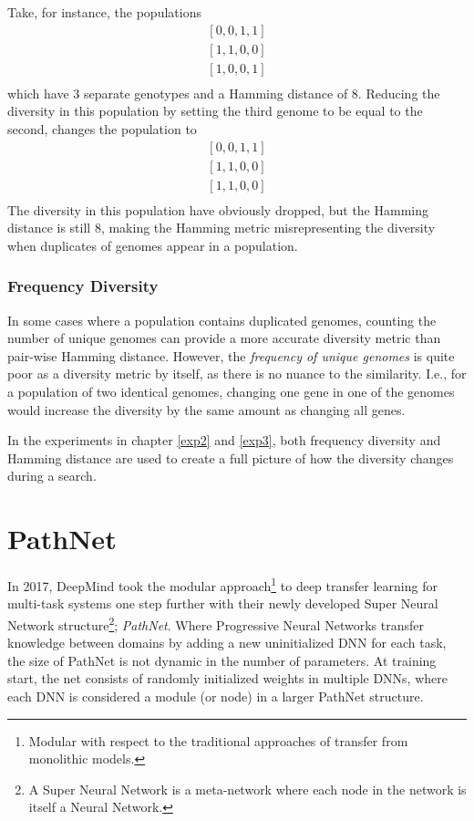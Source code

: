 Take, for instance, the populations 
\begin{equation*}
    \begin{split}
        [0, 0, 1, 1]\\
        [1, 1, 0, 0]\\
        [1, 0, 0, 1]\\
    \end{split}
\end{equation*}
which have 3 separate genotypes and a Hamming distance of 8. Reducing the diversity in this population by setting the third genome to be equal to the second, changes the population to 
\begin{equation*}
    \begin{split}
        [0, 0, 1, 1]\\
        [1, 1, 0, 0]\\
        [1, 1, 0, 0]\\
    \end{split}
\end{equation*}
The diversity in this population have obviously dropped, but the Hamming distance is still 8, making the Hamming metric misrepresenting the diversity when duplicates of genomes appear in a population. 

\subsubsection{Frequency Diversity}
In some cases where a population contains duplicated genomes, counting the number of unique genomes can provide a more accurate diversity metric than pair-wise Hamming distance. However, the \textit{frequency of unique genomes} is quite poor as a diversity metric by itself, as there is no nuance to the similarity. I.e., for a population of two identical genomes, changing one gene in one of the genomes would increase the diversity by the same amount as changing all genes. 

In the experiments in chapter \ref{exp2} and \ref{exp3}, both frequency diversity and Hamming distance are used to create a full picture of how the diversity changes during a search.

\section{PathNet}
\label{background:pn}
In 2017, DeepMind took the modular approach\footnote{Modular with respect to the traditional approaches of transfer from monolithic models.} to deep transfer learning for multi-task systems one step further with their newly developed Super Neural Network structure\footnote{A Super Neural Network is a meta-network where each node in the network is itself a Neural Network.}; \textit{PathNet}\cite{pathnet}. Where Progressive Neural Networks transfer knowledge between domains by adding a new uninitialized DNN for each task, the size of PathNet is not dynamic in the number of parameters. At training start, the net consists of randomly initialized weights in multiple DNNs, where each DNN is considered a module (or node) in a larger PathNet structure. 

